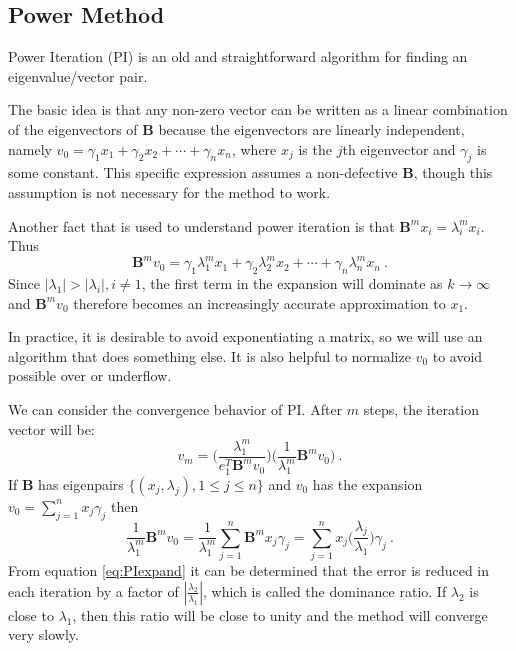 \documentclass[12pt]{article}
\newcommand{\ve}[1]{\ensuremath{\mathbf{#1}}}
\begin{document}
\subsection*{Power Method}

Power Iteration (PI) is an old and straightforward algorithm for finding an eigenvalue/vector pair. 

The basic idea is that any non-zero vector can be written as a linear combination of the eigenvectors of $\ve{B}$ because the eigenvectors are linearly independent, namely $v_0 = \gamma_1 x_1 + \gamma_2 x_2 + \cdots + \gamma_n x_n$, where $x_{j}$ is the $j$th eigenvector and $\gamma_{j}$ is some constant. This specific expression assumes a non-defective $\ve{B}$, though this assumption is not necessary for the method to work. 

Another fact that is used to understand power iteration is that $\ve{B}^m x_i = \lambda_i^m x_i$. Thus
%
\begin{equation}
  \ve{B}^m v_{0} = \gamma_1 \lambda_1^m x_1 + \gamma_2 \lambda_2^m x_2 + \cdots + \gamma_n \lambda_n^m x_n \:.\nonumber
  \label{eq:Ak}
\end{equation}
%
Since $|\lambda_1| > |\lambda_i|, i \ne 1$, the first term in the expansion will dominate as $k \to \infty$ and $\ve{B}^m v_{0}$ therefore becomes an increasingly accurate approximation to $x_1$. 

In practice, it is desirable to avoid exponentiating a matrix, so we will use an algorithm that does something else. It is also helpful to normalize $v_0$ to avoid possible over or underflow.

We can consider the convergence behavior of PI. After $m$ steps, the iteration vector will be: 
%
\begin{equation}
  v_{m} = \bigl( \frac{\lambda_{1}^{m}}{e_{1}^{T}\ve{B}^{m}v_{0}} \bigr) \bigl(\frac{1}{\lambda_{1}^{m}}\ve{B}^{m}v_{0} \bigr) \:. \nonumber
\end{equation}
% 
If $\ve{B}$ has eigenpairs $\{(x_{j}, \lambda_{j}), 1 \le j \le n \}$ and $v_{0}$ has the expansion $v_{0} = \sum_{j=1}^{n} x_{j}\gamma_{j}$ then
%
\begin{equation}
  \frac{1}{\lambda_{1}^{m}}\ve{B}^{m}v_{0} =  \frac{1}{\lambda_{1}^{m}} \sum_{j=1}^{n} \ve{B}^{m}x_{j}\gamma_{j} = \sum_{j=1}^{n} x_{j} \bigl(\frac{\lambda_{j}}{\lambda_{1}} \bigr) \gamma_{j} \:.
  \label{eq:PIexpand}
\end{equation}
%
From equation \eqref{eq:PIexpand} it can be determined that the error is reduced in each iteration by a factor of $|\frac{\lambda_{2}}{\lambda_{1}}|$, which is called the dominance ratio. If $\lambda_2$ is close to $\lambda_1$, then this ratio will be close to unity and the method will converge very slowly. 
\end{document}
